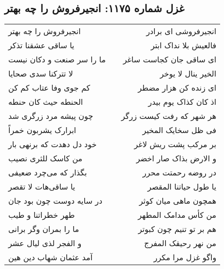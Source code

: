 \begin{center}
\section*{غزل شماره ۱۱۷۵: انجیرفروش را چه بهتر}
\label{sec:1175}
\begin{longtable}{l p{0.5cm} r}
انجیرفروش را چه بهتر
&&
انجیرفروشی ای برادر
\\
یا ساقی عشقنا تذکر
&&
فالعیش بلا نداک ابتر
\\
ما را سر صنعت و دکان نیست
&&
ای ساقی جان کجاست ساغر
\\
لا تترکنا سدی صحایا
&&
الخیر ینال لا یوخر
\\
کم جوی وفا عتاب کم کن
&&
ای زنده کن هزار مضطر
\\
الحنطه حیث کان حنطه
&&
اذ کان کذاک یوم بیدر
\\
چون پیشه مرد زرگری شد
&&
هر شهر که رفت کیست زرگر
\\
ابرارک یشربون خمراً
&&
فی ظل سخایک المخیر
\\
خود دل دهدت که برنهی بار
&&
بر مرکب پشت ریش لاغر
\\
من کاسک للثری نصیب
&&
و الارض بذاک صار اخضر
\\
بگذار که می‌چرد ضعیفی
&&
در روضه رحمتت محرر
\\
یا ساقی‌هات لا تقصر
&&
یا طول حیاتنا المقصر
\\
در سایه دوست چون بود جان
&&
همچون ماهی میان کوثر
\\
طهر خطراتنا و طیب
&&
من کأس مدامک المطهر
\\
ما را بمران وگر برانی
&&
هم بر تو تنیم چون کبوتر
\\
و الفجر لذی لیال عشر
&&
من نهر رحیقک المفرج
\\
آمد عثمان شهاب دین هین
&&
واگو غزل مرا مکرر
\\
\end{longtable}
\end{center}
